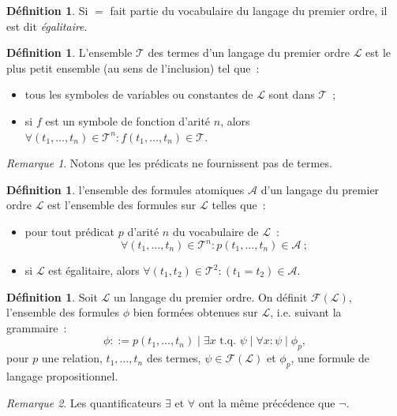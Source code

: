 \documentclass{article}
\theoremstyle{definition}
\newtheorem{déf}[thm]{Définition}
\theoremstyle{remark}
\newtheorem*{rmq}{Remarque}
\newcommand{\tq}{\text{ t.q. }}
\begin{document}
	\begin{déf} Si $=$ fait partie du vocabulaire du langage du premier ordre, il est dit \textit{égalitaire}.
	\end{déf}

	\begin{déf} L'ensemble $\mathcal T$ des termes d'un langage du premier ordre $\mathcal L$ est le plus petit ensemble (au sens de l'inclusion) tel que~:
	\begin{itemize}
		\item tous les symboles de variables ou constantes de $\mathcal L$ sont dans $\mathcal T$~;
		\item si $f$ est un symbole de fonction d'arité $n$, alors $\forall (t_1, \ldots, t_n) \in \mathcal T^n : f(t_1, \ldots, t_n) \in \mathcal T$.
	\end{itemize}
	\end{déf}

	\begin{rmq} Notons que les prédicats ne fournissent pas de termes.
	\end{rmq}

	\begin{déf} l'ensemble des formules atomiques $\mathcal A$ d'un langage du premier ordre $\mathcal L$ est l'ensemble des formules sur $\mathcal L$ telles que~:
	\begin{itemize}
		\item pour tout prédicat $p$ d'arité $n$ du vocabulaire de $\mathcal L$~:
		\[\forall (t_1, \ldots, t_n) \in \mathcal T^n : p(t_1, \ldots, t_n) \in \mathcal A~;\]
		\item si $\mathcal L$ est égalitaire, alors $\forall (t_1, t_2) \in \mathcal T^2 : (t_1=t_2) \in \mathcal A$.
	\end{itemize}
	\end{déf}

	\begin{déf} Soit $\mathcal L$ un langage du premier ordre. On définit $\mathcal F(\mathcal L)$, l'ensemble des formules $\phi$ bien formées
	obtenues sur $\mathcal L$, i.e. suivant la grammaire~:
	\[\phi ::= p(t_1, \ldots, t_n) \mid \exists x \tq \psi \mid \forall x : \psi \mid \phi_p,\]
	pour $p$ une relation, $t_1, \ldots, t_n$ des termes, $\psi \in \mathcal F(\mathcal L)$ et $\phi_p$, une formule de langage propositionnel.
	\end{déf}

	\begin{rmq} Les quantificateurs $\exists$ et $\forall$ ont la même précédence que $\lnot$.
	\end{rmq}
\end{document}

